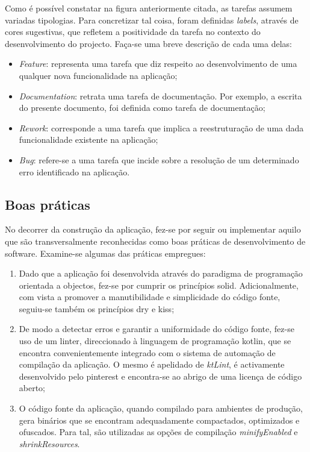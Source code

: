 \documentclass[12pt]{report}
\begin{document}
Como é possível constatar na figura anteriormente citada, as tarefas assumem variadas tipologias. Para concretizar tal coisa, foram definidas \textit{labels}, através de cores sugestivas, que refletem a positividade da tarefa no contexto do desenvolvimento do projecto. Faça-se uma breve descrição de cada uma delas:

\begin{itemize}
    \item \emph{Feature}: representa uma tarefa que diz respeito ao desenvolvimento de uma qualquer nova funcionalidade na aplicação;
    
    \item \emph{Documentation}: retrata uma tarefa de documentação. Por exemplo, a escrita do presente documento, foi definida como tarefa de documentação;
    
    \item \emph{Rework}: corresponde a uma tarefa que implica a reestruturação de uma dada funcionalidade existente na aplicação;
    
    \item \emph{Bug}: refere-se a uma tarefa que incide sobre a resolução de um determinado erro identificado na aplicação.
\end{itemize}

\clearpage

\subsection{Boas práticas}

No decorrer da construção da aplicação, fez-se por seguir ou implementar aquilo que são transversalmente reconhecidas como boas práticas de desenvolvimento de software. Examine-se algumas das práticas empregues:

\begin{enumerate}
    \item Dado que a aplicação foi desenvolvida através do paradigma de programação orientada a objectos, fez-se por cumprir os princípios \gls{solid}. Adicionalmente, com vista a promover a manutibilidade e simplicidade do código fonte, seguiu-se também os princípios \gls{dry} e \gls{kiss};
    
    \item De modo a detectar erros e garantir a uniformidade do código fonte, fez-se uso de um \gls{linter}, direccionado à linguagem de programação \gls{kotlin}, que se encontra convenientemente integrado com o sistema de automação de compilação da aplicação. O mesmo é apelidado de \textit{ktLint}, é activamente desenvolvido pelo \gls{pinterest} e encontra-se ao abrigo de uma licença de código aberto;
    
    \item O código fonte da aplicação, quando compilado para ambientes de produção, gera binários que se encontram adequadamente compactados, optimizados e ofuscados. Para tal, são utilizadas as opções de compilação \textit{minifyEnabled} e \textit{shrinkResources}.
\end{enumerate}
\end{document}
